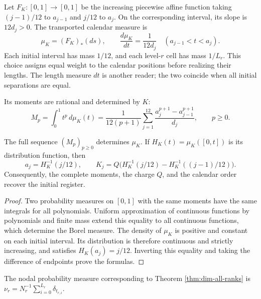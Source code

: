 Let \(F_K:[0,1]\to[0,1]\) be the increasing piecewise affine
function taking \((j-1)/12\) to \(a_{j-1}\) and \(j/12\) to
\(a_j\). On the corresponding interval, its slope is \(12d_j>0\).
The transported calendar measure is
\[
 \mu_K=(F_K)_*(ds),\qquad
 \frac{d\mu_K}{dt}=\frac1{12d_j}\quad
 (a_{j-1}<t<a_j).
\]
Each initial interval has mass \(1/12\), and each level-\(r\)
cell has mass \(1/L_r\). This choice assigns equal weight to the
calendar positions before realizing their lengths. The length measure
\(dt\) is another reader; the two coincide when all initial
separations are equal.

Its moments are rational and determined by \(K\):
\begin{equation}
 M_p=\int_0^1t^p\,d\mu_K(t)
   =\frac1{12(p+1)}\sum_{j=1}^{12}
       \frac{a_j^{p+1}-a_{j-1}^{p+1}}{d_j},\qquad p\geq0.
 \label{eq:dim-moments}
\end{equation}
\begin{proposition}
\label{prop:dim-moment-recovery}
The full sequence \((M_p)_{p\geq0}\) determines \(\mu_K\).
If \(H_K(t)=\mu_K([0,t])\) is its distribution function, then
\[
 a_j=H_K^{-1}(j/12),\qquad
 K_j=Q\bigl(H_K^{-1}(j/12)-H_K^{-1}((j-1)/12)\bigr).
\]
Consequently, the complete moments, the charge \(Q\), and the calendar
order recover the initial register.
\end{proposition}
\begin{proof}
Two probability measures on \([0,1]\) with the same moments have the
same integrals for all polynomials. Uniform approximation of continuous
functions by polynomials and finite mass extend this equality to all
continuous functions, which determine the Borel measure. The density
of \(\mu_K\) is positive and constant on each initial interval.
Its distribution is therefore continuous and strictly increasing, and
satisfies \(H_K(a_j)=j/12\). Inverting this equality and taking the
difference of endpoints prove the formulas.
\end{proof}

The nodal probability measure corresponding to Theorem
\ref{thm:dim-all-ranks} is
\(\nu_r=N_r^{-1}\sum_{i=0}^{L_r}\delta_{t_{r,i}}\).

